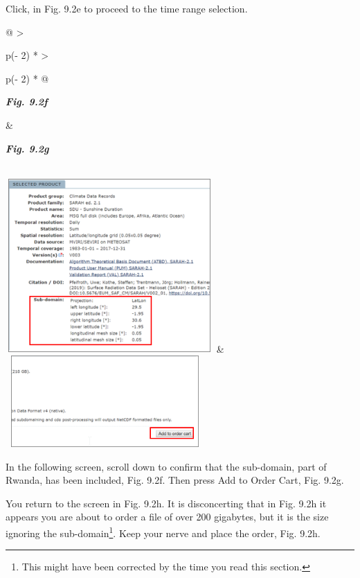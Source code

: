 \documentclass[
  letterpaper,
  DIV=11,
  numbers=noendperiod]{scrreprt}
\begin{document}
Click, in Fig. 9.2e to proceed to the time range selection.

\begin{longtable}[]{@{}
  >{\raggedright\arraybackslash}p{(\columnwidth - 2\tabcolsep) * }
  >{\raggedright\arraybackslash}p{(\columnwidth - 2\tabcolsep) * }@{}}
\toprule\noalign{}
\begin{minipage}[b]{\linewidth}\raggedright
\textbf{\emph{Fig. 9.2f}}
\end{minipage} & \begin{minipage}[b]{\linewidth}\raggedright
\textbf{\emph{Fig. 9.2g}}
\end{minipage} \\
\midrule\noalign{}
\endhead
\bottomrule\noalign{}
\endlastfoot
\includegraphics[width=3.12627in,height=2.61119in]{figures/Fig9.2f.png}
&
\includegraphics[width=2.99713in,height=1.37602in]{figures/Fig9.2g.png} \\
\end{longtable}

In the following screen, scroll down to confirm that the sub-domain,
part of Rwanda, has been included, Fig. 9.2f. Then press Add to Order
Cart, Fig. 9.2g.

You return to the screen in Fig. 9.2h. It is disconcerting that in Fig.
9.2h it appears you are about to order a file of over 200 gigabytes, but
it is the size ignoring the sub-domain\footnote{This might have been
  corrected by the time you read this section.}. Keep your nerve and
place the order, Fig. 9.2h.
\end{document}
